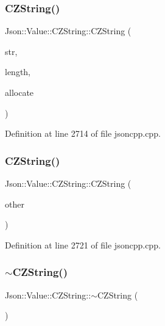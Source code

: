 \subsubsection{\texorpdfstring{C\+Z\+String()}{CZString()}\hspace{0.1cm}{\footnotesize\ttfamily [2/6]}}
{\footnotesize\ttfamily Json\+::\+Value\+::\+C\+Z\+String\+::\+C\+Z\+String (\begin{DoxyParamCaption}\item[{char const $\ast$}]{str,  }\item[{unsigned}]{length,  }\item[{\hyperlink{class_json_1_1_value_1_1_c_z_string_a2805c46fb4a72bbaed55de6d75941b6d}{Duplication\+Policy}}]{allocate }\end{DoxyParamCaption})}



Definition at line 2714 of file jsoncpp.\+cpp.

\hypertarget{class_json_1_1_value_1_1_c_z_string_a9685070d440335b55ef5c85747d25157}{}\label{class_json_1_1_value_1_1_c_z_string_a9685070d440335b55ef5c85747d25157} 
\subsubsection{\texorpdfstring{C\+Z\+String()}{CZString()}\hspace{0.1cm}{\footnotesize\ttfamily [3/6]}}
{\footnotesize\ttfamily Json\+::\+Value\+::\+C\+Z\+String\+::\+C\+Z\+String (\begin{DoxyParamCaption}\item[{\hyperlink{class_json_1_1_value_1_1_c_z_string}{C\+Z\+String} const \&}]{other }\end{DoxyParamCaption})}



Definition at line 2721 of file jsoncpp.\+cpp.

\hypertarget{class_json_1_1_value_1_1_c_z_string_add6989dc7073646b95e5ebacb3f07d51}{}\label{class_json_1_1_value_1_1_c_z_string_add6989dc7073646b95e5ebacb3f07d51} 
\subsubsection{\texorpdfstring{$\sim$\+C\+Z\+String()}{~CZString()}\hspace{0.1cm}{\footnotesize\ttfamily [1/2]}}
{\footnotesize\ttfamily Json\+::\+Value\+::\+C\+Z\+String\+::$\sim$\+C\+Z\+String (\begin{DoxyParamCaption}{ }\end{DoxyParamCaption})}



